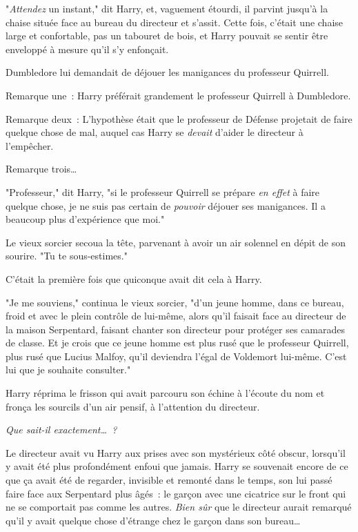 "\emph{Attendez} un instant," dit Harry, et, vaguement étourdi, il parvint jusqu'à la chaise située face au bureau du directeur et s'assit. Cette fois, c'était une chaise large et confortable, pas un tabouret de bois, et Harry pouvait se sentir être enveloppé à mesure qu'il s'y enfonçait.

Dumbledore lui demandait de déjouer les manigances du professeur Quirrell.

Remarque une~: Harry préférait grandement le professeur Quirrell à Dumbledore.

Remarque deux~: L'hypothèse était que le professeur de Défense projetait de faire quelque chose de mal, auquel cas Harry se \emph{devait} d'aider le directeur à l'empêcher.

Remarque trois…

"Professeur," dit Harry, "si le professeur Quirrell se prépare \emph{en effet} à faire quelque chose, je ne suis pas certain de \emph{pouvoir} déjouer ses manigances. Il a beaucoup plus d'expérience que moi."

Le vieux sorcier secoua la tête, parvenant à avoir un air solennel en dépit de son sourire. "Tu te sous-estimes."

C'était la première fois que quiconque avait dit cela à Harry.

"Je me souviens," continua le vieux sorcier, "d'un jeune homme, dans ce bureau, froid et avec le plein contrôle de lui-même, alors qu'il faisait face au directeur de la maison Serpentard, faisant chanter son directeur pour protéger ses camarades de classe. Et je crois que ce jeune homme est plus rusé que le professeur Quirrell, plus rusé que Lucius Malfoy, qu'il deviendra l'égal de Voldemort lui-même. C'est lui que je souhaite consulter."

Harry réprima le frisson qui avait parcouru son échine à l'écoute du nom et fronça les sourcils d'un air pensif, à l'attention du directeur.

\emph{Que sait-il exactement…~?}

Le directeur avait vu Harry aux prises avec son mystérieux côté obscur, lorsqu'il y avait été plus profondément enfoui que jamais. Harry se souvenait encore de ce que ça avait été de regarder, invisible et remonté dans le temps, son lui passé faire face aux Serpentard plus âgés~: le garçon avec une cicatrice sur le front qui ne se comportait pas comme les autres. \emph{Bien sûr} que le directeur aurait remarqué qu'il y avait quelque chose d'étrange chez le garçon dans son bureau…

